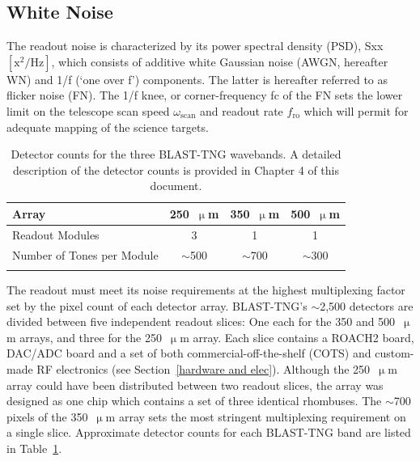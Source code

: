 \vspace{5mm}

\subsection{White Noise}\label{white noise}

The readout noise is characterized by its power spectral density (PSD), \gls{Sxx} $\left[\mathrm{x}^{2}/\mathrm{Hz}\right]$, which consists of additive white Gaussian noise (AWGN, hereafter WN) and 1/f (`one over f') components. The latter is hereafter referred to as flicker noise (FN). The 1/f knee, or corner-frequency \gls{fc} of the FN sets the lower limit on the telescope scan speed $\omega_{\mathrm{scan}}$ and readout rate $f_{\mathrm{ro}}$ which will permit for adequate mapping of the science targets.

\begin{table}[!htbp]
\centering
\begin{tabular}{@{}lccc@{}}
\dtoprule{}
Array                      & 250~$\upmu$m & 350~$\upmu$m & 500~$\upmu$m   \\ \midrule
Readout Modules            & 3               & 1               & 1  \\ \midrule
Number of Tones per Module & $\sim$500             & $\sim$700             &  $\sim$300   \\ \dbottomrule{}
\\
\end{tabular}
\caption[~Detector counts for the three BLAST-TNG wavebands.]{Detector counts for the three BLAST-TNG wavebands. A detailed description of the detector counts is provided in Chapter 4 of this document.}
\label{tab:det counts}
\end{table}

The readout must meet its noise requirements at the highest multiplexing factor set by the pixel count of each detector array. BLAST-TNG's $\sim$2,500 detectors are divided between five independent readout slices: One each for the 350 and 500~$\upmu$m arrays, and three for the 250~$\upmu$m array. Each slice contains a ROACH2 board, DAC/ADC board and a set of both commercial-off-the-shelf (COTS) and custom-made RF electronics (see Section~\ref{hardware and elec}). Although the 250~$\upmu$m array could have been distributed between two readout slices, the array was designed as one chip which contains a set of three identical rhombuses. The $\sim$700 pixels of the 350~$\upmu$m array sets the most stringent multiplexing requirement on a single slice. Approximate detector counts for each BLAST-TNG band are listed in Table~\ref{tab:det counts}.

